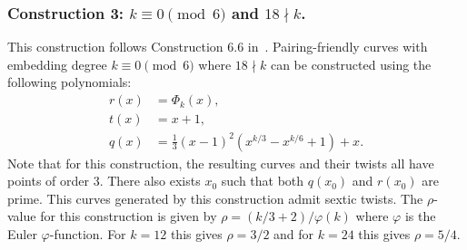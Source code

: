 
\subsubsection{Construction 3: $k \equiv 0 \pmod{6}$ and $18 \nmid k$.}
\label{con3}

This construction follows {Construction 6.6} in~\cite{2010/freeman}.
Pairing-friendly curves with embedding degree $k \equiv 0 \pmod{6}$ where $18 \nmid k$
can be constructed using the following polynomials:
\begin{align*}
r(x) &= \Phi_k(x),	\\
t(x) &= x+1,		\\
q(x) &= \frac{1}{3} (x-1)^2 (x^{k/3} - x^{k/6} + 1) + x.
\end{align*}
Note that for this construction,
the resulting curves and their twists all have points of order 3.
There also exists $x_0$ such that both $q(x_0)$ and $r(x_0)$ are prime.
This curves generated by this construction admit sextic twists.
The $\rho$-value for this construction is given by $\rho = (k/3+2)/\varphi(k)$
where $\varphi$ is the Euler $\varphi$-function.
For $k=12$ this gives $\rho = 3/2$ and for $k=24$ this gives $\rho = 5/4$.


